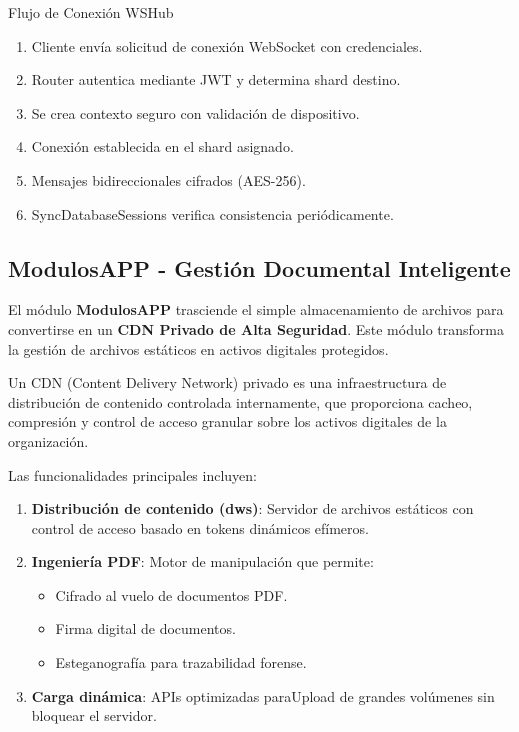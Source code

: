 \begin{caja}{Flujo de Conexión WSHub}
\begin{enumerate}
\item Cliente envía solicitud de conexión WebSocket con credenciales.
\item Router autentica mediante JWT y determina shard destino.
\item Se crea contexto seguro con validación de dispositivo.
\item Conexión establecida en el shard asignado.
\item Mensajes bidireccionales cifrados (AES-256).
\item SyncDatabaseSessions verifica consistencia periódicamente.
\end{enumerate}
\end{caja}

\subsection{ModulosAPP - Gestión Documental Inteligente}

El módulo \textbf{ModulosAPP} trasciende el simple almacenamiento de archivos para convertirse en un \textbf{CDN Privado de Alta Seguridad}. Este módulo transforma la gestión de archivos estáticos en activos digitales protegidos.

\begin{definicion}
Un CDN (Content Delivery Network) privado es una infraestructura de distribución de contenido controlada internamente, que proporciona cacheo, compresión y control de acceso granular sobre los activos digitales de la organización.
\end{definicion}

Las funcionalidades principales incluyen:

\begin{enumerate}
\item \textbf{Distribución de contenido (dws)}: Servidor de archivos estáticos con control de acceso basado en tokens dinámicos efímeros.
\item \textbf{Ingeniería PDF}: Motor de manipulación que permite:
   \begin{itemize}
   \item Cifrado al vuelo de documentos PDF.
   \item Firma digital de documentos.
   \item Esteganografía para trazabilidad forense.
   \end{itemize}
\item \textbf{Carga dinámica}: APIs optimizadas paraUpload de grandes volúmenes sin bloquear el servidor.
\end{enumerate}


